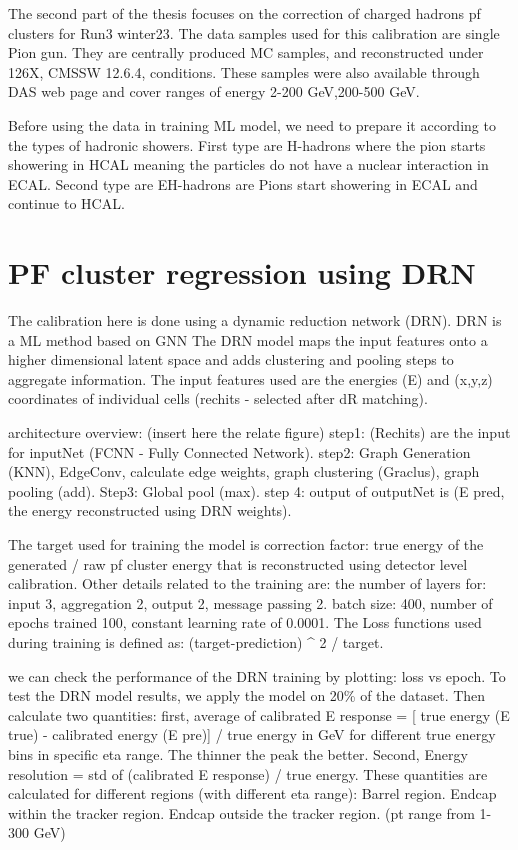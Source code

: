 The second part of the thesis focuses on the correction of charged hadrons pf clusters for Run3 winter23. The data samples used for this calibration are single Pion gun. They are centrally produced MC samples, and reconstructed under 126X, CMSSW 12.6.4, conditions. These samples were also available through DAS web page and cover ranges of energy 2-200 GeV,200-500 GeV.

Before using the data in training ML model, we need to prepare it according to the types of hadronic showers. First type are H-hadrons where the pion starts showering in HCAL meaning the particles do not have a nuclear interaction in ECAL. Second type are EH-hadrons are Pions start showering in ECAL and continue to HCAL.  

\section{PF cluster regression using DRN}

The calibration here is done using a dynamic reduction network (DRN). DRN is a ML method based on GNN %
The DRN model maps the input features onto a higher dimensional latent space and adds clustering and pooling steps to aggregate information. The input features used are the energies (E) and (x,y,z) coordinates of individual cells (rechits - selected after dR matching).

architecture overview: (insert here the relate figure) 
step1: (Rechits) are the input for inputNet (FCNN - Fully Connected Network). 
step2:  Graph Generation (KNN), EdgeConv, calculate edge weights, graph clustering (Graclus), graph pooling (add). 
Step3: Global pool (max).  
step 4: output of outputNet is (E pred, the energy reconstructed using DRN weights).

The target used for training the model is correction factor:  true energy of the generated / raw pf cluster energy that is reconstructed using detector level calibration. Other details related to the training are: the number of layers for: input 3, aggregation 2, output 2, message passing 2. batch size: 400, number of epochs trained 100, constant learning rate of 0.0001. The Loss functions used during training is defined as: (target-prediction) ^ 2 / target.

we can check the performance of the DRN training by plotting: loss vs epoch. To test the DRN model results, we apply the model on 20\% of the dataset. Then calculate two quantities: first, average of calibrated E response = [ true energy (E true) - calibrated energy (E pre)] / true energy in GeV for different true energy bins in specific eta range. The thinner the peak the better. 
Second, Energy resolution = std of (calibrated E response) / true energy. These quantities are calculated for different regions (with different eta range): Barrel region. Endcap within the tracker region. Endcap outside the tracker region. (pt range from 1-300 GeV)

